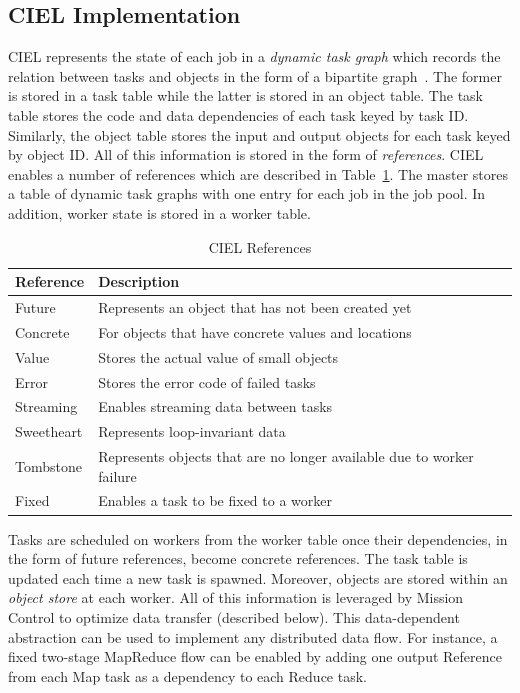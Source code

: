 \documentclass[a4paper,12pt,twoside,openright]{report}
\begin{document}
\subsection{CIEL Implementation}
CIEL represents the state of each job in a \emph{dynamic task graph} which
records the relation between tasks and objects in the form of a bipartite
graph~\cite{Murray:2011:CUE,Murray:2011:ADE}. The former is stored in a task
table while the latter is stored in an object table. The task table stores the
code and data dependencies of each task keyed by task ID. Similarly, the object
table stores the input and output objects for each task keyed by object ID. All
of this information is stored in the form of \emph{references}. CIEL enables a
number of references which are described in
Table~\ref{chap:implem:sec:ciel:tab:ref}. The master stores a table of dynamic
task graphs with one entry for each job in the job pool. In addition, worker
state is stored in a worker table.

\begin{table}
  \centering
  \begin{tabular}{| l || l |}
    \hline
	\textbf{Reference} & \textbf{Description} \\ \hline \hline
    Future & Represents an object that has not been created yet \\ \hline
    Concrete &  For objects that have concrete values and locations \\ \hline
    Value & Stores the actual value of small objects \\ \hline
    Error & Stores the error code of failed tasks \\ \hline
    Streaming & Enables streaming data between tasks \\ \hline
    Sweetheart & Represents loop-invariant data \\ \hline
    Tombstone & Represents objects that are no longer available due to worker
    failure
    \\ \hline
    Fixed & Enables a task to be fixed to a worker\\
    \hline
  \end{tabular}
  \caption{CIEL References}
  \label{chap:implem:sec:ciel:tab:ref}
\end{table}

Tasks are scheduled on workers from the worker table once their dependencies, in
the form of future references, become concrete references. The task table is
updated each time a new task is spawned. Moreover, objects are stored within an
\emph{object store} at each worker. All of this information is leveraged by
Mission Control to optimize data transfer (described below). This data-dependent
abstraction can be used to implement any distributed data flow. For instance, a
fixed two-stage MapReduce flow can be enabled by adding one output Reference
from each Map task as a dependency to each Reduce task.
\end{document}
